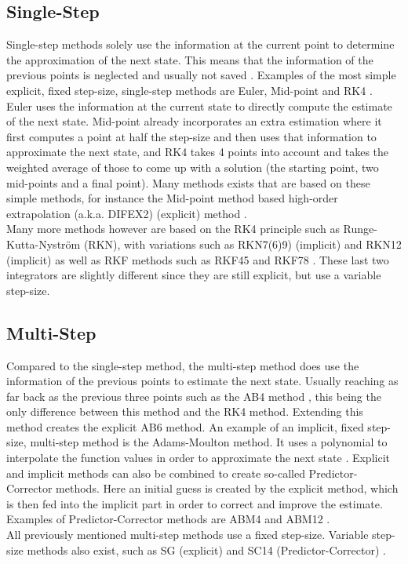 \subsection{Single-Step}
\label{subsec:singleStep}
Single-step methods solely use the information at the current point to determine the approximation of the next state. This means that the information of the previous points is neglected and usually not saved \citep{noomen2013int}. Examples of the most simple explicit, fixed step-size, single-step methods are Euler, Mid-point and \ac{RK4} \citep{hofsteenge2013}. Euler uses the information at the current state to directly compute the estimate of the next state. Mid-point already incorporates an extra estimation where it first computes a point at half the step-size and then uses that information to approximate the next state, and \ac{RK4} takes 4 points into account and takes the weighted average of those to come up with a solution (the starting point, two mid-points and a final point). Many methods exists that are based on these simple methods, for instance the Mid-point method based high-order extrapolation (a.k.a. DIFEX2) (explicit) method \citep{deuflhard1994}.\\
Many more methods however are based on the \ac{RK4} principle such as Runge-Kutta-Nystr\"{o}m (RKN), with variations such as RKN7(6)9) (implicit) \citep{montenbruck1992,dormand1987} and \ac{RKN12} (implicit) \citep{montenbruck1992}  as well as \ac{RKF} methods such as \acf{RKF45} and \acf{RKF78} \citep{fehlberg1969,fehlberg1968}. These last two integrators are slightly different since they are still explicit, but use a variable step-size.


\subsection{Multi-Step}
\label{subsec:multiStep}
Compared to the single-step method, the multi-step method does use the information of the previous points to estimate the next state. Usually reaching as far back as the previous three points such as the \ac{AB4} method \citep{noomen2013int}, this being the only difference between this method and the \ac{RK4} method. Extending this method creates the explicit \ac{AB6} method. An example of an implicit, fixed step-size, multi-step method is the Adams-Moulton method. It uses a polynomial to interpolate the function values in order to approximate the next state \citep{noomen2013int}. Explicit and implicit methods can also be combined to create so-called Predictor-Corrector methods. Here an initial guess is created by the explicit method, which is then fed into the implicit part in order to correct and improve the estimate. Examples of Predictor-Corrector methods are \ac{ABM4} and \ac{ABM12} \citep{montenbruck1992,noomen2013int}. \\
All previously mentioned multi-step methods use a fixed step-size. Variable step-size methods also exist, such as \ac{SG} (explicit) \citep{meijaard1991,berry2004} and \ac{SC14} (Predictor-Corrector) \citep{berry2004,ramos2005}.


